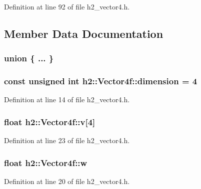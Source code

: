Definition at line 92 of file h2\-\_\-vector4.\-h.



\subsection{Member Data Documentation}
\hypertarget{classh2_1_1_vector4f_a6130ae34a096abfd0752e37e619db060}{\subsubsection[{"@21}]{\setlength{\rightskip}{0pt plus 5cm}union \{ ... \} }}\label{classh2_1_1_vector4f_a6130ae34a096abfd0752e37e619db060}
\hypertarget{classh2_1_1_vector4f_a90eac6433c542cc1f8c9f7d8994275be}{
\subsubsection[{dimension}]{\setlength{\rightskip}{0pt plus 5cm}const unsigned int h2\-::\-Vector4f\-::dimension = 4\hspace{0.3cm}{\ttfamily [static]}}}\label{classh2_1_1_vector4f_a90eac6433c542cc1f8c9f7d8994275be}


Definition at line 14 of file h2\-\_\-vector4.\-h.

\hypertarget{classh2_1_1_vector4f_a8d4487c739f8e98225f89f50274b92cc}{
\subsubsection[{v}]{\setlength{\rightskip}{0pt plus 5cm}float h2\-::\-Vector4f\-::v\mbox{[}4\mbox{]}}}\label{classh2_1_1_vector4f_a8d4487c739f8e98225f89f50274b92cc}


Definition at line 23 of file h2\-\_\-vector4.\-h.

\hypertarget{classh2_1_1_vector4f_aa59d06bc0affb9f4fa5c559ccd834bca}{
\subsubsection[{w}]{\setlength{\rightskip}{0pt plus 5cm}float h2\-::\-Vector4f\-::w}}\label{classh2_1_1_vector4f_aa59d06bc0affb9f4fa5c559ccd834bca}


Definition at line 20 of file h2\-\_\-vector4.\-h.

